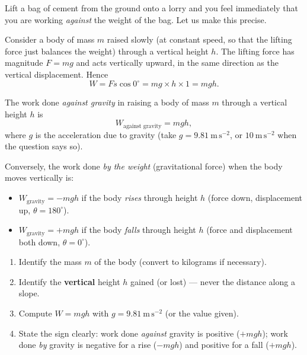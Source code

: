 \documentclass[11pt]{article}
\newcounter{popsec}
\newcounter{popsub}
\newcommand{\courssub}[1]{%
  \stepcounter{popsub}%
  \par\vspace{9pt}\noindent{\popxbold\fontsize{11.5}{13}\selectfont\color{popink}{\color{poporange}\thepopsec.\thepopsub}\hspace{6pt}#1}\par\nopagebreak\vspace{4pt}
}
\begin{document}
\courssub{Work Done Against Gravity}

Lift a bag of cement from the ground onto a lorry and you feel immediately that you are working \emph{against} the weight of the bag. Let us make this precise.

Consider a body of mass $m$ raised slowly (at constant speed, so that the lifting force just balances the weight) through a vertical height $h$. The lifting force has magnitude $F = mg$ and acts vertically upward, in the same direction as the vertical displacement. Hence
\[
W = Fs\cos 0^\circ = mg \times h \times 1 = mgh.
\]

\begin{aretenir}
The work done \emph{against gravity} in raising a body of mass $m$ through a vertical height $h$ is
\[
W_{\text{against gravity}} = mgh,
\]
where $g$ is the acceleration due to gravity (take $g = 9.81\ \mathrm{m\,s^{-2}}$, or $10\ \mathrm{m\,s^{-2}}$ when the question says so). 

Conversely, the work done \emph{by the weight} (gravitational force) when the body moves vertically is:
\begin{itemize}
\item $W_{\text{gravity}} = -mgh$ if the body \emph{rises} through height $h$ (force down, displacement up, $\theta=180^\circ$).
\item $W_{\text{gravity}} = +mgh$ if the body \emph{falls} through height $h$ (force and displacement both down, $\theta=0^\circ$).
\end{itemize}
\end{aretenir}

\begin{methode}
\begin{enumerate}
\item Identify the mass $m$ of the body (convert to kilograms if necessary).
\item Identify the \textbf{vertical} height $h$ gained (or lost) --- never the distance along a slope.
\item Compute $W = mgh$ with $g = 9.81\ \mathrm{m\,s^{-2}}$ (or the value given).
\item State the sign clearly: work done \emph{against} gravity is positive ($+mgh$); work done \emph{by} gravity is negative for a rise ($-mgh$) and positive for a fall ($+mgh$).
\end{enumerate}
\end{methode}
\end{document}
